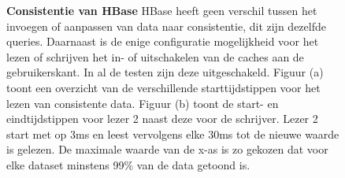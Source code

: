 \begin{figure}[ht!] 
	\centering

	\caption{\textbf{Consistentie van HBase} \newline
	HBase heeft geen verschil tussen het invoegen of aanpassen van data naar consistentie, dit zijn dezelfde queries. Daarnaast is de enige configuratie mogelijkheid voor het lezen of schrijven het in- of uitschakelen van de caches aan de gebruikerskant. In al de testen zijn deze uitgeschakeld.  \newline
	Figuur (a) toont een overzicht van de verschillende starttijdstippen voor het lezen van consistente data. Figuur (b) toont de start- en eindtijdstippen voor lezer 2 naast deze voor de schrijver. Lezer 2 start met op 3ms en leest vervolgens elke 30ms tot de nieuwe waarde is gelezen. De maximale waarde van de x-as is zo gekozen dat voor elke dataset minstens 99\% van de data getoond is. }
	\label{fig:consistentie-hbase}
\end{figure}




